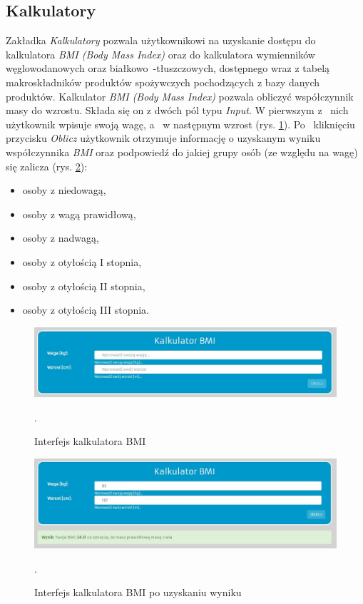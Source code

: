 \subsection{Kalkulatory}
Zakładka \textit{Kalkulatory} pozwala użytkownikowi na uzyskanie dostępu do kalkulatora \textit{BMI (Body Mass Index)} oraz do kalkulatora wymienników węglowodanowych oraz białkowo~-tłuszczowych, dostępnego wraz z tabelą makroskładników produktów spożywczych pochodzących z bazy danych produktów. 
Kalkulator \textit{BMI (Body Mass Index)} pozwala obliczyć współczynnik masy do wzrostu. Składa się on z dwóch pól typu 
\textit{Input}. W pierwszym z~ nich użytkownik wpisuje swoją wagę, a~ w następnym wzrost (rys. \ref{Rys:bmiBefore}). Po~ kliknięciu przycisku \textit{Oblicz} użytkownik otrzymuje informację o uzyskanym wyniku współczynnika \textit{BMI} oraz podpowiedź do jakiej grupy osób (ze względu na wagę) się zalicza (rys. \ref{Rys:bmiAfter}):

\begin{itemize}
	\item osoby z niedowagą,
	\item osoby z wagą prawidłową,
	\item osoby z nadwagą,
	\item osoby z otyłością I stopnia,
	\item osoby z otyłością II stopnia,
	\item osoby z otyłością III stopnia.
\end{itemize}

\begin{figure}[h]
	\centering\includegraphics[scale=0.5]{images/bmi_before.jpg}
	\caption{Interfejs kalkulatora BMI}.
	\label{Rys:bmiBefore}
\end{figure}

\begin{figure}[h]
	\centering\includegraphics[scale=0.5]{images/bmi_after.jpg}
	\caption{Interfejs kalkulatora BMI po uzyskaniu wyniku}.
	\label{Rys:bmiAfter}
\end{figure}

